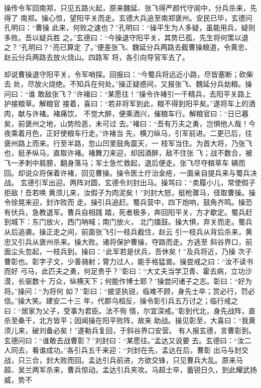 操传令军回南郑，只见五路火起，原来魏延、张飞得严颜代守阆中，分兵杀来，先得了
南郑。操心惊，望阳平关而走。玄德大兵追至南郑褒州。安民已毕，玄德问孔明曰：“曹操
此来，何败之速也？”孔明曰：“操平生为人多疑，虽能用兵，疑则多败。吾以疑兵胜
之。”玄德曰：“今操退守阳平关，其势已孤，先生将何策以退之？”孔明曰？“亮已算定
了。”便差张飞、魏延分兵两路去截曹操粮道，令黄忠、赵云分兵两路去放火烧山。四路军
将，各引向导官军去了。

却说曹操退守阳平关，令军哨探。回报曰：“今蜀兵将远近小路，尽皆塞断；砍柴去
处，尽放火烧绝。不知兵在何处。”操正疑惑间，又报张飞、魏延分兵劫粮。操问曰：“谁
敢敌张飞？”许褚曰：“某愿往！”操令许褚引一千精兵，去阳平关路上护接粮草。解粮官
接着，喜曰：“若非将军到此，粮不得到阳平矣。”遂将车上的酒肉，献与许褚。褚痛饮，
不觉大醉，便乘酒兴，催粮车行。解粮官曰：“日已暮矣，前褒州之地，山势险恶，未可过
去。”褚曰：“吾有万夫之勇，岂惧他人哉！今夜乘着月色，正好使粮车行走。”许褚当
先，横刀纵马，引军前进。二更已后，往褒州路上而来。行至半路，忽山凹里鼓角震天，一
枝军当住。为首大将，乃张飞也，挺矛纵马，直取许褚。褚舞刀来迎，却因酒醉，敌不住张
飞；战不数合，被飞一矛刺中肩膀，翻身落马；军士急忙救起，退后便走。张飞尽夺粮草车
辆而回。却说众将保着许褚，回见曹操。操令医士疗治金疮，一面亲自提兵来与蜀兵决战。
玄德引军出迎。两阵对圆，玄德令刘封出马。操骂曰：“卖履小儿，常使假子拒敌！吾若唤
黄须儿来，汝假子为肉泥矣！”刘封大怒，挺枪骤马，径取曹操。操令徐晃来迎，封诈败而
走。操引兵追赶。蜀兵营中，四下炮响，鼓角齐鸣。操恐有伏兵，急教退军。曹兵自相践
踏，死者极多，奔回阳平关，方才歇定。蜀兵赶到城下：东门放火，西门呐喊；南门放火，
北门擂鼓。操大惧，弃关而走。蜀兵从后追袭。操正走之间，前面张飞引一枝兵截住，赵云
引一枝兵从背后杀来，黄忠又引兵从褒州杀来。操大败。诸将保护曹操，夺路而走。方逃至
斜谷界口，前面尘头忽起，一枝兵到。操曰：“此军若是伏兵，吾休矣！”及兵将近，乃操
次子曹彰也。彰字子文，少善骑射；膂力过人，能手格猛兽。操尝戒之曰：“汝不读书而好
弓马，此匹夫之勇，何足贵乎？”彰曰：“大丈夫当学卫青、霍去病，立功沙漠，长驱数十
万众，纵横天下；何能作博士耶？”操尝问诸子之志。彰曰：“好为将。”操问：“为将何
如？”彰曰：“披坚执锐，临难不顾，身先士卒；赏必行，罚必信。”操大笑。建安二十三
年，代郡乌桓反，操令彰引兵五万讨之；临行戒之曰：“居家为父子，受事为君臣。法不徇
情，尔宜深戒。”彰到代北，身先战阵，直杀至桑干，北方皆平；因闻操在阳平败阵，故来
助战。操见彰至，大喜曰：“我黄须儿来，破刘备必矣！”遂勒兵复回，于斜谷界口安营。
有人报玄德，言曹彰到。玄德问曰：“谁敢去战曹彰？”刘封曰：“某愿往。”孟达又说要
去。玄德曰：“汝二人同去，看谁成功。”各引兵五千来迎：“刘封在先，孟达在后，曹彰
出马与封交战，只三合，封大败而回。孟达引兵前进，方欲交锋，只见曹兵大乱。原来马
超、吴兰两军杀来，曹兵惊动。孟达引兵夹攻。马超士卒，蓄锐日久，到此耀武扬威，势不
